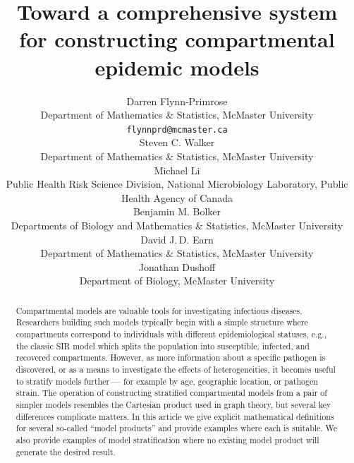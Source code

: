 \documentclass{article}
\theoremstyle{definition}
\begin{document}
\title{Toward a comprehensive system for constructing compartmental epidemic models}

\author{Darren Flynn-Primrose \\
  Department of Mathematics \& Statistics, McMaster University \\
  \texttt{flynnprd@mcmaster.ca} \\
  \And Steven C. Walker \\
  Department of Mathematics \& Statistics, McMaster University \\
  \And Michael Li \\
  Public Health Risk Science Division, National Microbiology Laboratory, Public Health Agency of Canada \\
  \And Benjamin M. Bolker \\
  Departments of Biology and Mathematics \& Statistics, McMaster University \\
  \And David J.\,D. Earn \\
  Department of Mathematics \& Statistics, McMaster University \\
  \And Jonathan Dushoff \\
  Department of Biology, McMaster University
}

\maketitle
    
\begin{abstract}
  Compartmental models are valuable tools for investigating infectious diseases. Researchers building such models typically begin with a simple structure where compartments correspond to individuals with different epidemiological statuses, e.g., the classic SIR model which splits the population into susceptible, infected, and recovered compartments. However,
  as more information about a specific pathogen is discovered, or as a means to
  investigate the effects of heterogeneities, it becomes useful to stratify models further --- for example by age, geographic location, or pathogen strain. The operation of constructing stratified compartmental models from a pair of simpler models resembles the Cartesian product used in graph theory, but several key differences complicate matters. In this article we give explicit mathematical definitions for several so-called ``model products'' and provide examples where each is suitable. We also provide examples of model stratification where no existing model product will generate the desired result. 
\end{abstract}
\end{document}
